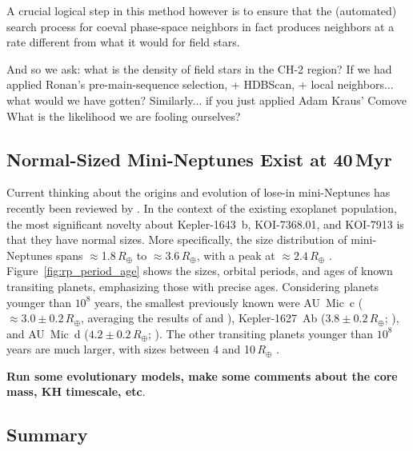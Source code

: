 \documentclass[12pt,twocolumn,linenumbers]{aastex63}
\begin{document}
A crucial logical step in this method however is to ensure that the
(automated) search process for coeval phase-space neighbors in fact
produces neighbors at a rate different from what it would for field
stars.

And so we ask: what is the density of field stars in the CH-2 region?
If we had applied Ronan's pre-main-sequence selection, + HDBScan, +
local neighbors... what would we have gotten?
Similarly... if you just applied Adam Kraus' Comove 
What is the likelihood we are fooling ourselves?


\subsection{Normal-Sized Mini-Neptunes Exist at 40$\,$Myr}

Current thinking about the origins and evolution of lose-in
mini-Neptunes has recently been reviewed by \citet{bean_nature_2021}.
In the context of the existing exoplanet population, the most
significant novelty about Kepler-1643~b, KOI-7368.01, and KOI-7913 is
that they have normal sizes.
More specifically, the size distribution of mini-Neptunes spans
$\approx$1.8\,$R_\oplus$ to $\approx$3.6\,$R_\oplus$, with a peak at
$\approx 2.4\,R_\oplus$ \citep[][Figure~7]{Fulton_et_al_2017}.
Figure~\ref{fig:rp_period_age} shows the sizes, orbital periods, and ages of
known transiting planets, emphasizing those with precise ages.
Considering planets younger than $10^8$ years, the smallest previously
known were AU~Mic~c ($\approx3.0\pm0.2\,R_\oplus$, averaging the
results of \citealt{martioli_aumicbc_2021} and
\citealt{gilbert_flares_2022}), Kepler-1627~Ab ($3.8\pm0.2\,R_\oplus$;
\citealt{bouma_kep1627_2022}), and AU~Mic~d ($4.2\pm0.2\,R_\oplus$;
\citealt{plavchan_planet_2020}).
The other transiting planets younger than $10^8$ years are much
larger, with sizes between 4 and 10$\,R_\oplus$
\citep{Mann_K2_33b_2016,David_et_al_2017,benatti_possibly_2019,david_four_2019,newton_tess_2019,rizzuto_tess_2020,bouma_cluster_2020}.

{\bf Run some evolutionary models, make some comments about the core
mass, KH timescale, etc}.






\subsection{Summary}
\end{document}
